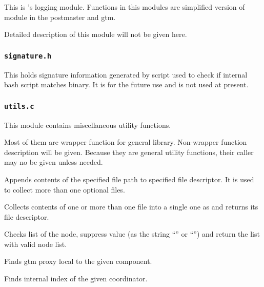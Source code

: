   This is 's logging module.
  Functions in this modules are simplified version of  module in the postmaster and gtm.
  
  Detailed description of this module will not be given here.



\subsubsection{\texttt{signature.h}}

  This holds signature information generated by  script used to check if
  internal bash script matches  binary.
  It is for the future use and is not used at present.



\subsubsection{\texttt{utils.c}}

  This module contains miscellaneous utility functions.
  
  Most of them are wrapper function for general library.
  Non-wrapper function description will be given.
  Because they are general utility functions, their caller may no be given unless needed.
  
  
      Appends contents of the specified file path to specified file descriptor.
      It is used to collect more than one optional files.
  
  
      Collects contents of one or more than one file into a single one as  and returns its
      file descriptor.
  
  
      Checks list of the node, suppress  value (as the string ``'' or ``'')
      and return the list with valid node list.
  
  
      Finds gtm proxy local to the given component.
  
  
      Finds internal index of the given coordinator.
  
